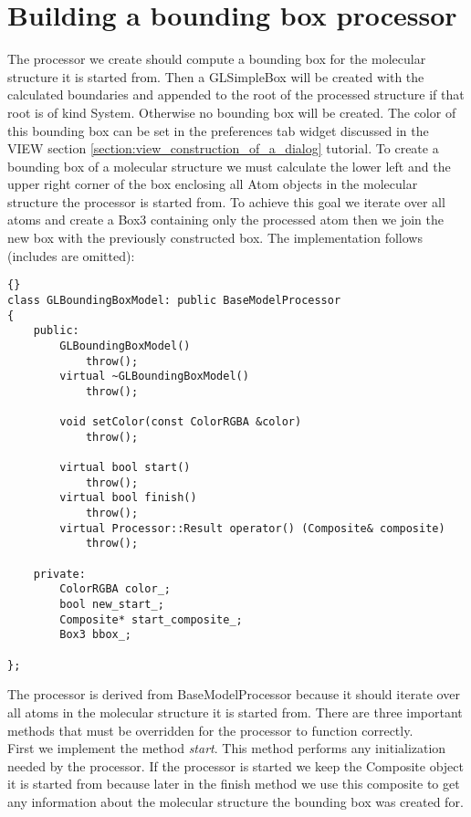 \section{Building a bounding box processor}
\label{section:bounding_box_processor}

The processor we create should compute a bounding box for the molecular structure
it is started from. Then a GLSimpleBox will be created with the calculated
boundaries and appended to the root of the processed structure if that root is
of kind System. Otherwise no bounding box will be created. The color of this
bounding box can be set in the preferences tab widget discussed in the VIEW section 
\ref{section:view_construction_of_a_dialog} tutorial.
To create a bounding box of a molecular structure we must calculate the lower left 
and the upper right corner of the box enclosing all Atom objects in the molecular
structure the processor is started from. To achieve this goal we iterate over all atoms
and create a Box3 containing only the processed atom then we join the new box
with the previously constructed box.
The implementation follows (includes are omitted):

\begin{lstlisting}{}
class GLBoundingBoxModel: public BaseModelProcessor
{
	public:
		GLBoundingBoxModel() 
			throw();
		virtual ~GLBoundingBoxModel()
			throw();

		void setColor(const ColorRGBA &color) 
			throw();

		virtual bool start()
			throw();
		virtual bool finish()
			throw();
		virtual Processor::Result operator() (Composite& composite)
			throw();

	private:
		ColorRGBA color_;
		bool new_start_;
		Composite* start_composite_;
		Box3 bbox_;

};
\end{lstlisting}

The processor is derived from BaseModelProcessor because
it should iterate over all atoms in the molecular structure it is started from.
There are three important methods that must be overridden for the processor
to function correctly.\\
First we implement the method {\em start}. This method performs any initialization
needed by the processor. If the processor is started we keep the Composite object
it is started from because later in the finish method we use this composite to get
any information about the molecular structure the bounding box was created for.

